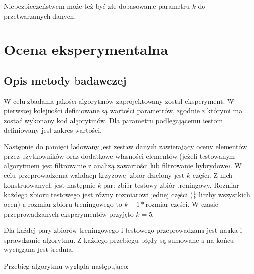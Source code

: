 \documentclass[twoside]{iisthesis}
\begin{document}
		 Niebezpieczeństwem może też być złe dopasowanie parametru $k$ do przetwarzanych danych.
 
\chapter{Ocena eksperymentalna}
	\section{Opis metody badawczej}
	
		W celu zbadania jakości algorytmów zaprojektowany został eksperyment. W pierwszej kolejności definiowane są wartości parametrów, zgodnie z którymi ma zostać wykonany kod algorytmów. 
		Dla parametru podlegającemu testom definiowany jest zakres wartości. 
		
		Następnie do pamięci ładowany jest zestaw danych zawierający oceny elementów przez użytkowników oraz dodatkowe własności elementów (jeżeli testowanym algorytmem jest filtrowanie z analizą zawartości lub filtrowanie hybrydowe). W celu przeprowadzenia walidacji krzyżowej zbiór dzielony jest $k$ części. Z nich konstruowanych jest następnie $k$ par: zbiór testowy-zbiór treningowy. Rozmiar każdego zbioru testowego jest równy rozmiarowi jednej części ($\frac{1}{k}$ liczby wszystkich ocen) a rozmiar zbioru treningowego to $k-1*$rozmiar części. W czasie przeprowadzanych eksperymentów przyjęto $k=5$.
		
		Dla każdej pary zbiorów treningowego i testowego przeprowadzana jest nauka i sprawdzanie algorytmu. Z każdego przebiegu błędy są sumowane a na końcu wyciągana jest średnia.
		
		Przebieg algorytmu wygląda następująco:
		
\end{document}
